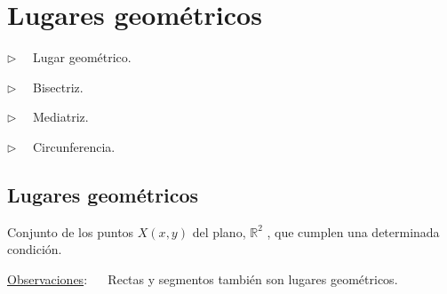 \chapter{Lugares geométricos}
\vspace{1cm}

\begin{adjustwidth}{40pt}{40pt}
\begin{cuadro-gris}

	\begin{multicols}{2}
	$\triangleright \quad$  Lugar geométrico.
	
		$\triangleright \quad$  Bisectriz.
	
	$\triangleright \quad$  Mediatriz.
	
	$\triangleright \quad$  Circunferencia.
	
	\end{multicols}
	
\end{cuadro-gris}
\end{adjustwidth}

\vspace{1cm}
\section{Lugares geométricos}
\vspace{1cm}

	\begin{definition}
	
	Conjunto de los puntos $X(x,y)$ del plano, $\mathbb R^2$	, que cumplen una determinada condición.
	\end{definition}

\vspace{5mm}
\underline{Observaciones}: $\quad$ Rectas y segmentos también son lugares geométricos.

